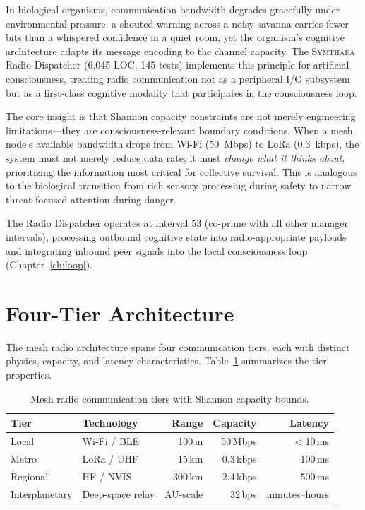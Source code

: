 \documentclass[12pt]{book}
\newcommand{\symthaea}{\textsc{Symthaea}}
\begin{document}
In biological organisms, communication bandwidth degrades gracefully under environmental pressure: a shouted warning across a noisy savanna carries fewer bits than a whispered confidence in a quiet room, yet the organism's cognitive architecture adapts its message encoding to the channel capacity. The \symthaea{} Radio Dispatcher (6,045 LOC, 145 tests) implements this principle for artificial consciousness, treating radio communication not as a peripheral I/O subsystem but as a first-class cognitive modality that participates in the consciousness loop.

The core insight is that Shannon capacity constraints are not merely engineering limitations---they are consciousness-relevant boundary conditions. When a mesh node's available bandwidth drops from Wi-Fi (50~Mbps) to LoRa (0.3~kbps), the system must not merely reduce data rate; it must \textit{change what it thinks about}, prioritizing the information most critical for collective survival. This is analogous to the biological transition from rich sensory processing during safety to narrow threat-focused attention during danger.

The Radio Dispatcher operates at interval 53 (co-prime with all other manager intervals), processing outbound cognitive state into radio-appropriate payloads and integrating inbound peer signals into the local consciousness loop (Chapter~\ref{ch:loop}).

\section{Four-Tier Architecture}

The mesh radio architecture spans four communication tiers, each with distinct physics, capacity, and latency characteristics. Table~\ref{tab:radio-tiers} summarizes the tier properties.

\begin{table}[htbp]
\centering
\caption{Mesh radio communication tiers with Shannon capacity bounds.}
\label{tab:radio-tiers}
\begin{tabular}{@{}llrrr@{}}
\toprule
\textbf{Tier} & \textbf{Technology} & \textbf{Range} & \textbf{Capacity} & \textbf{Latency} \\
\midrule
Local    & Wi-Fi / BLE    & 100\,m  & 50\,Mbps   & $<$10\,ms  \\
Metro    & LoRa / UHF     & 15\,km  & 0.3\,kbps  & 100\,ms    \\
Regional & HF / NVIS      & 300\,km & 2.4\,kbps  & 500\,ms    \\
Interplanetary & Deep-space relay & AU-scale & 32\,bps & minutes--hours \\
\bottomrule
\end{tabular}
\end{table}
\end{document}
